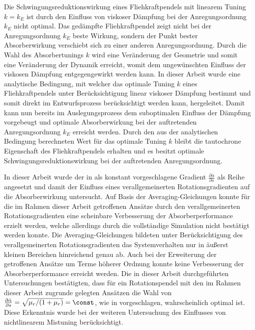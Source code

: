 Die Schwingungsreduktionswirkung eines Fliehkraftpendels mit linearem Tuning $k=k_E$ 
ist durch den Einfluss von viskoser Dämpfung  bei der Anregungsordnung $k_E$ nicht optimal.
Das gedämpfte Fliehkraftpendel zeigt nicht bei der Anregungsordnung $k_E$ beste Wirkung,
sondern der Punkt bester Absorberwirkung verschiebt sich zu einer 
anderen Anregungsordnung. 
Durch die Wahl des Absorbertunings $k$ wird eine Veränderung der Geometrie und somit
eine Veränderung der Dynamik erreicht, womit
dem ungewünschten Einfluss der viskosen Dämpfung entgegengewirkt werden kann. 
In dieser Arbeit wurde eine  analytische Bedingung, mit welcher das optimale Tuning $k$ eines
Fliehkraftpendels unter Berücksichtigung linear viskoser Dämpfung bestimmt
und somit direkt im Entwurfsprozess berücksichtigt werden kann, hergeleitet.
%
Damit kann nun  bereits im Auslegungsprozess dem suboptimalen Einfluss der Dämpfung 
vorgebeugt und optimale Absorberwirkung bei der auftretenden 
Anregungsordnung $k_E$ erreicht werden.  
%
Durch den aus der analytischen Bedingung berechneten Wert für das optimale 
Tuning $k$ bleibt die tautochrone Eigenschaft des Fliehkraftpendels erhalten
und es besitzt optimale Schwingungsreduktionswirkung bei der
auftretenden Anregungsordnung. 

 
In dieser Arbeit wurde der in \cite{Mayet:Tautochronic} als 
konstant vorgeschlagene Gradient $\frac{\partial \bar{\alpha}}{\partial s}$ 
als Reihe angesetzt und damit der Einfluss eines verallgemeinerten Rotationsgradienten 
auf die Absorberwirkung untersucht. 
Auf Basis der Averaging-Gleichungen konnte für die im Rahmen dieser Arbeit getroffenen
Ansätze durch den verallgemeinerten Rotationsgradienten eine scheinbare
Verbesserung der Absorberperformance erzielt werden, welche allerdings durch die
vollständige Simulation nicht bestätigt werden konnte.
Die Averaging-Gleichungen bildeten unter Berücksichtigung des verallgemeinerten Rotationsgradienten das Systemverhalten 
nur in äußerst kleinen Bereichen hinreichend  genau ab.
Auch bei der Erweiterung der getroffenen Ansätze um Terme höherer Ordnung
konnte keine Verbesserung der Absorberperformance %
erreicht werden. 
Die in dieser Arbeit durchgeführten Untersuchungen bestätigten, dass für ein Rotationspendel
mit den im Rahmen dieser Arbeit zugrunde gelegten  Ansätzen die Wahl von  
$\frac{\partial \bar{\alpha}}{\partial s} = \sqrt{\mu_r/(1+\mu_r)}= \const$,
wie in \cite{Mayet:Tautochronic} vorgeschlagen, wahrscheinlich
optimal ist. 
Diese Erkenntnis wurde bei der weiteren Untersuchung des Einflusses von
nichtlinearem Mistuning berücksichtigt. 

